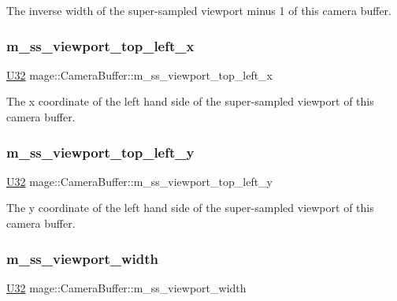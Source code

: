 The inverse width of the super-\/sampled viewport minus 1 of this camera buffer. \hypertarget{structmage_1_1_camera_buffer_a0584c712968ff83e6b22fa0ad83e0da5}{}\label{structmage_1_1_camera_buffer_a0584c712968ff83e6b22fa0ad83e0da5} 
\subsubsection{\texorpdfstring{m\+\_\+ss\+\_\+viewport\+\_\+top\+\_\+left\+\_\+x}{m\_ss\_viewport\_top\_left\_x}}
{\footnotesize\ttfamily \hyperlink{namespacemage_a41c104c036fba3756a74e19f793eeaa1}{U32} mage\+::\+Camera\+Buffer\+::m\+\_\+ss\+\_\+viewport\+\_\+top\+\_\+left\+\_\+x}

The x coordinate of the left hand side of the super-\/sampled viewport of this camera buffer. \hypertarget{structmage_1_1_camera_buffer_ac6c5a7af84cef485dd9ddacd018e4a82}{}\label{structmage_1_1_camera_buffer_ac6c5a7af84cef485dd9ddacd018e4a82} 
\subsubsection{\texorpdfstring{m\+\_\+ss\+\_\+viewport\+\_\+top\+\_\+left\+\_\+y}{m\_ss\_viewport\_top\_left\_y}}
{\footnotesize\ttfamily \hyperlink{namespacemage_a41c104c036fba3756a74e19f793eeaa1}{U32} mage\+::\+Camera\+Buffer\+::m\+\_\+ss\+\_\+viewport\+\_\+top\+\_\+left\+\_\+y}

The y coordinate of the left hand side of the super-\/sampled viewport of this camera buffer. \hypertarget{structmage_1_1_camera_buffer_af7a4718829dc96716c4861bbe00bb7e0}{}\label{structmage_1_1_camera_buffer_af7a4718829dc96716c4861bbe00bb7e0} 
\subsubsection{\texorpdfstring{m\+\_\+ss\+\_\+viewport\+\_\+width}{m\_ss\_viewport\_width}}
{\footnotesize\ttfamily \hyperlink{namespacemage_a41c104c036fba3756a74e19f793eeaa1}{U32} mage\+::\+Camera\+Buffer\+::m\+\_\+ss\+\_\+viewport\+\_\+width}

